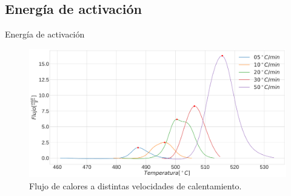 \documentclass[11pt]{beamer}
\begin{document}
	\subsection{Energía de activación}
	\begin{frame}{Energía de activación}
		\begin{figure}
			\includegraphics[scale=0.1]{img/DSCPeaks.png}
			\caption*{Flujo de calores a distintas velocidades de calentamiento.}
		\end{figure}
	\end{frame}
	
\end{document}
